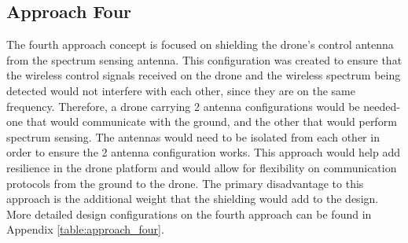 \subsection{Approach Four}
The fourth approach concept is focused on shielding the drone’s control antenna from the spectrum sensing antenna. This configuration was created to ensure that the wireless control signals received on the drone and the wireless spectrum being detected would not interfere with each other, since they are on the same frequency. Therefore, a drone carrying 2 antenna configurations would be needed- one that would communicate with the ground, and the other that would perform spectrum sensing. The antennas would need to be isolated from each other in order to ensure the 2 antenna configuration works. This approach would help add resilience in the drone platform and would allow for flexibility on communication protocols from the ground to the drone. The primary disadvantage to this approach is the additional weight that the shielding would add to the design. More detailed design configurations on the fourth approach can be found in Appendix \ref{table:approach_four}.


